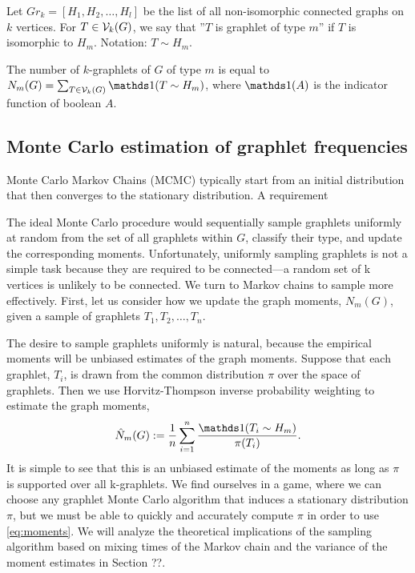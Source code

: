 	Let $Gr_k = [H_1, H_2, \ldots, H_l]$ be the list of all non-isomorphic
	connected graphs on $k$ vertices. For $T\in \mathcal{V}_k(G)$, we say that ''$T$ is graphlet of
	 type $m$'' if $T$ is isomorphic to $H_m$. Notation: $T \sim H_m$.
	
	The number of $k$-graphlets of $G$ of type $m$ is equal to 
	$N_m (G) = \sum_{T \in \cV_k(G)} \ind(T \sim H_m)$, where $\ind(A)$ 
	is the indicator function of boolean $A$.

    \subsection{Monte Carlo estimation of graphlet frequencies}
	
	    Monte Carlo Markov Chains (MCMC) typically start from an initial distribution that then converges to the stationary distribution.
    A requirement 

    The ideal Monte Carlo procedure would sequentially sample graphlets uniformly at random from the set of all graphlets within $G$, classify their type, and update the corresponding moments.  
Unfortunately, uniformly sampling graphlets is not a simple task because they are required to be connected---a random set of k vertices is unlikely to be connected.
We turn to Markov chains to sample more effectively.
First, let us consider how we update the graph moments, $N_m(G)$, given a sample of graphlets $T_1, T_2, \ldots, T_n$.

The desire to sample graphlets uniformly is natural, because the empirical moments will be unbiased estimates of the graph moments.
Suppose that each graphlet, $T_i$, is drawn from the common distribution $\pi$ over the space of graphlets.
Then we use Horvitz-Thompson inverse probability weighting to estimate the graph moments,
\begin{equation}
  \label{eq:moments}
  \hat N_m(G) := \frac{1}{n} \sum_{i=1}^n \frac{\ind(T_i\sim H_m)}{\pi(T_i)}.  
\end{equation}
It is simple to see that this is an unbiased estimate of the moments as long as $\pi$ is supported over all k-graphlets.
We find ourselves in a game, where we can choose any graphlet Monte Carlo algorithm that induces a stationary distribution $\pi$, but we must be able to quickly and accurately compute $\pi$ in order to use \eqref{eq:moments}.
We will analyze the theoretical implications of the sampling algorithm based on mixing times of the Markov chain and the variance of the moment estimates in Section ??.

